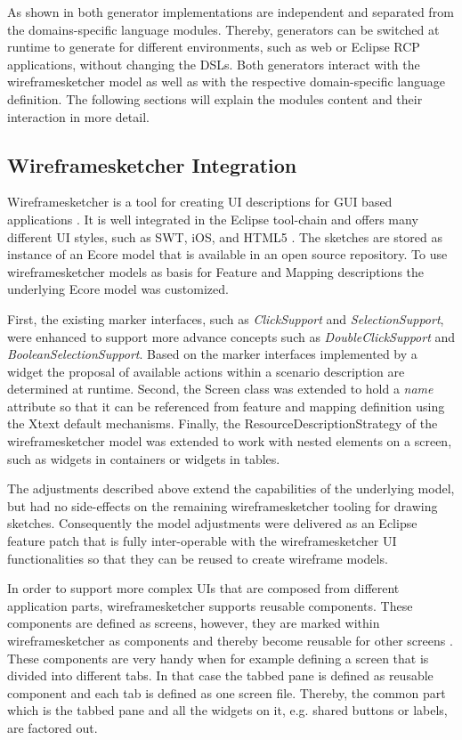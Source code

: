 \documentclass{sig-alternate-05-2015}
\begin{document}
As shown in  both generator implementations are independent and separated from the domains-specific language modules.
Thereby, generators can be switched at runtime to generate for different environments, such as web or Eclipse RCP applications, without changing the DSLs.
Both generators interact with the wireframesketcher model as well as with the respective domain-specific language definition.
The following sections will explain the modules content and their interaction in more detail.

\subsection{Wireframesketcher Integration}\label{sec:WireframesketcherIntegration} 
Wireframesketcher is a tool for creating UI descriptions for GUI based applications \cite{sanchezgui}. 
It is well integrated in the Eclipse tool-chain and offers many different UI styles, such as SWT, iOS, and HTML5  \cite{Wireframesketcher}.
The sketches are stored as instance of an Ecore model that is available in an open source repository.
To use wireframesketcher models as basis for Feature and Mapping descriptions the underlying Ecore model was customized.

First, the existing marker interfaces, such as \textit{ClickSupport} and \textit{SelectionSupport}, were enhanced to support more advance concepts such as \textit{DoubleClickSupport} and \textit{BooleanSelectionSupport}.
Based on the marker interfaces implemented by a widget the proposal of available actions within a scenario description are determined at runtime.
Second, the Screen class was extended to hold a \textit{name} attribute so that it can be referenced from feature and mapping definition using the Xtext default mechanisms.
Finally, the ResourceDescriptionStrategy \cite{xtext.resourcedesc} of the wireframesketcher model was extended to work with nested elements on a screen, such as widgets in containers or widgets in tables.

The adjustments described above extend the capabilities of the underlying model, but had no side-effects on the remaining wireframesketcher tooling for drawing sketches.
Consequently the model adjustments were delivered as an Eclipse feature patch that is fully inter-operable with the wireframesketcher UI functionalities so that they can be reused to create wireframe models.

In order to support more complex UIs that are composed from different application parts, wireframesketcher supports reusable components.
These components are defined as screens, however, they are marked within wireframesketcher as components and thereby become reusable for other screens \cite{Wireframesketcher.components}.
These components are very handy when for example defining a screen that is divided into different tabs.
In that case the tabbed pane is defined as reusable component and each tab is defined as one screen file.
Thereby, the common part which is the tabbed pane and all the widgets on it, e.g. shared buttons or labels, are factored out.
\end{document}
